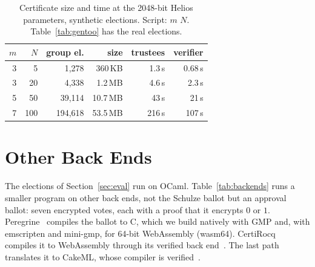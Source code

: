\begin{table}[h]
  \caption{Certificate size and time at the 2048-bit Helios parameters,
  synthetic elections. Script: 
  $m$ $N$. Table~\ref{tab:gentoo} has the real elections.}
  \label{tab:tallycost}
  \centering\scriptsize\setlength{\tabcolsep}{3pt}
  \begin{tabular}{@{}rrrrrr@{}}
    \toprule
    $m$ & $N$ & group el. & size & trustees & verifier \\
    \midrule
    3 & 5 & 1{,}278 & 360\,KB & 1.3\,s & 0.68\,s \\
    3 & 20 & 4{,}338 & 1.2\,MB & 4.6\,s & 2.3\,s \\
    5 & 50 & 39{,}114 & 10.7\,MB & 43\,s & 21\,s \\
    7 & 100 & 194{,}618 & 53.5\,MB & 216\,s & 107\,s \\
    \bottomrule
  \end{tabular}
\end{table}

\section{Other Back Ends}\label{app:backends}
The elections of Section~\ref{sec:eval} run on OCaml.
Table~\ref{tab:backends} runs a smaller program on other back ends, not
the Schulze ballot but an approval ballot: seven encrypted votes, each
with a proof that it encrypts $0$ or $1$.
Peregrine~\cite{peregrine} compiles the ballot to C, which we build natively with GMP and,
with emscripten and mini-gmp, for 64-bit WebAssembly (wasm64).
CertiRocq~\cite{anand2017certicoq} compiles it to WebAssembly through
its verified back end~\cite{meier2025certicoq}. The last path
translates it to CakeML, whose compiler is
verified~\cite{10.1145/2535838.2535841}.


